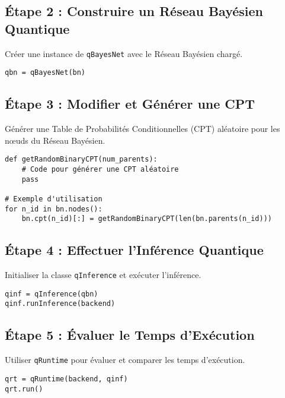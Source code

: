 
\subsection*{Étape 2 : Construire un Réseau Bayésien Quantique}
Créer une instance de \texttt{qBayesNet} avec le Réseau Bayésien chargé.
\begin{verbatim}
qbn = qBayesNet(bn)
\end{verbatim}


\subsection*{Étape 3 : Modifier et Générer une CPT}
Générer une Table de Probabilités Conditionnelles (CPT) aléatoire pour les nœuds du Réseau Bayésien.
\begin{verbatim}
def getRandomBinaryCPT(num_parents):
    # Code pour générer une CPT aléatoire
    pass

# Exemple d'utilisation
for n_id in bn.nodes():
    bn.cpt(n_id)[:] = getRandomBinaryCPT(len(bn.parents(n_id)))
\end{verbatim}


\subsection*{Étape 4 : Effectuer l'Inférence Quantique}
Initialiser la classe \texttt{qInference} et exécuter l'inférence.
\begin{verbatim}
qinf = qInference(qbn)
qinf.runInference(backend)
\end{verbatim}


\subsection*{Étape 5 : Évaluer le Temps d'Exécution}
Utiliser \texttt{qRuntime} pour évaluer et comparer les temps d'exécution.
\begin{verbatim}
qrt = qRuntime(backend, qinf)
qrt.run()
\end{verbatim}

